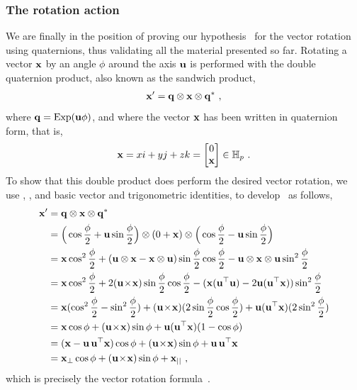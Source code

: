 \subsubsection{The rotation action}
\label{sec:qRotAction}

We are finally in the position of proving our hypothesis~ for the vector rotation  using quaternions,  
thus validating all the material presented so far.
%
Rotating a vector ${\bf x}$ by an angle $\phi$ around the axis ${\bf u}$ is performed with the double quaternion product, also known as the sandwich product,
%
\begin{align}
{\bf x}' = {\bf q}\otimes{\bf x}\otimes{\bf q}^* ~, \label{equ:sandwichProd}
\end{align}
%
where ${\bf q}=\operatorname*{Exp}({\bf u}\phi)$, and
where the vector ${\bf x}$ has been written in quaternion form, that is, 
%
\begin{align}
{\bf x}= x i + y j + z k = \begin{bmatrix}
0 \\ {\bf x}
\end{bmatrix} \in {\mathbb H}_p
~. \label{equ:quatvec}
\end{align}%
%
%
To show that this double product does perform the desired vector rotation, we use , 
, and basic vector and trigonometric identities, to develop~ as follows,
%
\begin{align}\label{equ:quatRotFormula}
\begin{split}
\bfx'
&= \bfq \ot \bfx \ot \bfq^* \\
&= \Big(\cos \frac{\phi}{2} + \bfu \sin \frac{\phi}{2}\Big)
 \ot (0+\bfx)
 \ot \Big(\cos \frac{\phi}{2} - \bfu \sin \frac{\phi}{2}\Big)
 \\
&= \bfx \cos^2 \frac{\phi}{2} + (\bfu\ot\bfx - \bfx\ot\bfu) \sin \frac{\phi}{2} \cos \frac{\phi}{2} - \bfu\ot\bfx\ot\bfu \sin^2 \frac{\phi}{2} \\
&= \bfx \cos^2 \frac{\phi}{2} + 2 (\bfu \tcross \bfx) \sin \frac{\phi}{2} \cos \frac{\phi}{2} - (\bfx (\bfu \tr \bfu) - 2 \bfu (\bfu \tr \bfx)) \sin^2 \frac{\phi}{2} \\
&= \bfx (\cos^2 \frac{\phi}{2} - \sin^2 \frac{\phi}{2}) + (\bfu \tcross \bfx) (2\sin\frac{\phi}{2} \cos\frac{\phi}{2}) + \bfu (\bfu \tr \bfx) (2\sin^2 \frac{\phi}{2}) \\
&= \bfx \cos \phi + (\bfu \tcross \bfx) \sin \phi + \bfu (\bfu \tr \bfx) (1 - \cos \phi) \\
&= (\bfx - \bfu \,\bfu \tr \bfx) \cos \phi + (\bfu \tcross \bfx) \sin \phi + \bfu \,\bfu \tr \bfx \\
&= \bfx_{\bot} \cos \phi + (\bfu \tcross \bfx) \sin \phi + \bfx_{||} ~,
\end{split}
\end{align}%
%
which is precisely the vector rotation formula~.


